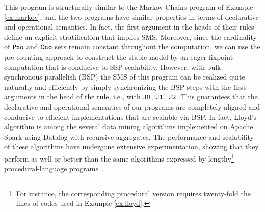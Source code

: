 \documentclass[11pt]{article}
\begin{document}
This program is structurally similar to  the  Markov Chains  program  of Example \ref{ex:markov},
and the two programs  have similar properties in terms of declarative  and operational semantics.
In fact, the first argument in the heads of their rules  define an explicit stratification that implies SMS.
Moreover, since the cardinality of   $\tt Pno$ and $\tt Cno$ sets remain constant throughout the computation,
 we can use the pre-counting approach to construct the stable model by an eager fixpoint computation that
 is conducive to SSP scalability. However, with bulk-synchronous parallelish (BSP) the SMS of this program can be realized
 quite naturally and efficiently by simply  synchronizing the BSP steps with the 
first arguments in the head of the rule, i.e., with $\tt J0$, $\tt J1$,  $\tt J2$.
% 
This guarantees that the declarative and operational  semantics of our programs are
 completely aligned and  conducive to  efficient implementations that are scalable via BSP.
In fact, Lloyd's algorithm is among the several data mining algorithms implemented
on Apache Spark using  Datalog with recursive aggregates. The 
performance and scalability of these algorithms have undergone extensive
experimentation, showing that they perform as well or better than 
the same algorithms expressed by lengthy\footnote{For instance,
the corresponding  procedural version requires  twenty-fold the
lines of codes used in Example \ref{ex:lloyd}.} procedural-language programs~\cite{bigdatalog,bigdatalog-mc,rasql,afrati2011map,rasqldemoSigmod20,datalogml,kddlog}.
\end{document}
